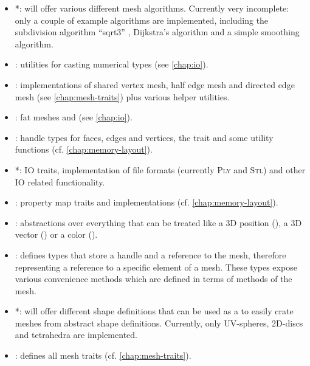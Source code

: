 \begin{itemize}
  \item \textbf{}*: will offer various different mesh algorithms.
  Currently very incomplete: only a couple of example algorithms are implemented, including the subdivision algorithm \enquote{sqrt3} \cite{kobbelt20003}, Dijkstra's algorithm \cite{dijkstra1959note} and a simple smoothing algorithm.
  \item \textbf{}: utilities for casting numerical types (see \autoref{chap:io}).
  \item \textbf{}: implementations of shared vertex mesh, half edge mesh and directed edge mesh (see \autoref{chap:mesh-traits}) plus various helper utilities.
  \item \textbf{}: fat meshes  and  (see \autoref{chap:io}).
  \item \textbf{}: handle types for faces, edges and vertices, the  trait and some utility functions (cf. \autoref{chap:memory-layout}).
  \item \textbf{}*: IO traits, implementation of file formats (currently \textsc{Ply} and \textsc{Stl}) and other IO related functionality.
  \item \textbf{}: property map traits and implementations (cf. \autoref{chap:memory-layout}).
  \item \textbf{}: abstractions over everything that can be treated like a 3D position (), a 3D vector () or a color ().
  \item \textbf{}: defines types that store a handle and a reference to the mesh, therefore representing a reference to a specific element of a mesh.
  These types expose various convenience methods which are defined in terms of methods of the mesh.
  \item \textbf{}*: will offer different shape definitions that can be used as a  to easily crate meshes from abstract shape definitions.
  Currently, only UV-spheres, 2D-discs and tetrahedra are implemented.
  \item \textbf{}: defines all mesh traits (cf. \autoref{chap:mesh-traits}).
\end{itemize}
